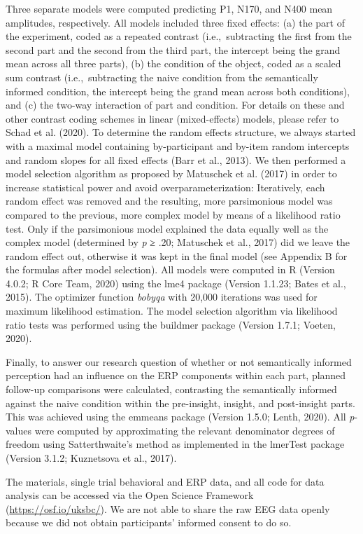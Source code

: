 \documentclass[
  english,
  doc,12pt,twoside,floatsintext]{apa7}
\begin{document}
Three separate models were computed predicting P1, N170, and N400 mean amplitudes, respectively. All models included three fixed effects: (a) the part of the experiment, coded as a repeated contrast (i.e.,~subtracting the first from the second part and the second from the third part, the intercept being the grand mean across all three parts), (b) the condition of the object, coded as a scaled sum contrast (i.e.,~subtracting the naive condition from the semantically informed condition, the intercept being the grand mean across both conditions), and (c) the two-way interaction of part and condition. For details on these and other contrast coding schemes in linear (mixed-effects) models, please refer to Schad et al. (2020). To determine the random effects structure, we always started with a maximal model containing by-participant and by-item random intercepts and random slopes for all fixed effects (Barr et al., 2013). We then performed a model selection algorithm as proposed by Matuschek et al. (2017) in order to increase statistical power and avoid overparameterization: Iteratively, each random effect was removed and the resulting, more parsimonious model was compared to the previous, more complex model by means of a likelihood ratio test. Only if the parsimonious model explained the data equally well as the complex model (determined by \emph{p} ≥ .20; Matuschek et al., 2017) did we leave the random effect out, otherwise it was kept in the final model (see Appendix B for the formulas after model selection). All models were computed in R (Version 4.0.2; R Core Team, 2020) using the lme4 package (Version 1.1.23; Bates et al., 2015). The optimizer function \emph{bobyqa} with 20,000 iterations was used for maximum likelihood estimation. The model selection algorithm via likelihood ratio tests was performed using the buildmer package (Version 1.7.1; Voeten, 2020).

Finally, to answer our research question of whether or not semantically informed perception had an influence on the ERP components within each part, planned follow-up comparisons were calculated, contrasting the semantically informed against the naive condition within the pre-insight, \mbox{insight}, and post-insight parts. This was achieved using the emmeans package (Version 1.5.0; Lenth, 2020). All \emph{p}-values were computed by approximating the relevant denominator degrees of freedom using Satterthwaite's method as implemented in the lmerTest package (Version 3.1.2; Kuznetsova et al., 2017).

The materials, single trial behavioral and ERP data, and all code for data analysis can be accessed via the Open Science Framework (\url{https://osf.io/uksbc/}). We are not able to share the raw EEG data openly because we did not obtain participants' informed consent to do so.
\end{document}
